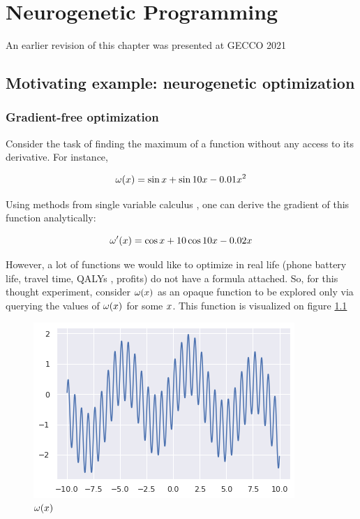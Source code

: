 \chapter{Neurogenetic Programming}\label{ch:neurogen}
\begin{remark}
    An earlier revision of this chapter \cite{liventsev2021neurogenetic,liventsevNeurogeneticProgrammingFramework2021} was presented at GECCO 2021
\end{remark}

\section{Motivating example: neurogenetic optimization}

\subsection{Gradient-free optimization}

Consider the task of finding the maximum of a function without any access to its derivative. For instance,

\begin{equation}
\omega(x) = \sin x + \sin 10 x - 0.01 x^2
\end{equation}

Using methods from single variable calculus \cite{antonCalculusSingleVariable2021}, one can derive the gradient of this function analytically:

\begin{equation}
\omega'(x) = \cos x + 10 \cos 10 x - 0.02 x
\end{equation}

However, a lot of functions we would like to optimize in real life (phone battery life, travel time, QALYs \cite{ryenWillingnessPayQuality2015, torranceUtilitiesQualityadjustedLife1989}, profits) do not have a formula attached. 
So, for this thought experiment, consider $ \omega(x) $ as an opaque function to be explored only via querying the values of $ \omega(x) $ for some $x$.
This function is visualized on figure \ref{fig:neuropt-f}
    
\begin{figure}
    \centering
    \includegraphics[width=0.8\linewidth]{images/neuropt1.png}
    \caption{$\omega(x)$}
    \label{fig:neuropt-f}
\end{figure}

